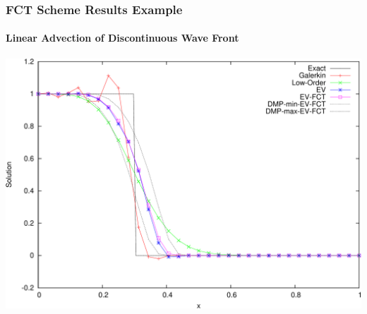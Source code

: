 \begin{frame}
\frametitle{FCT Scheme Results Example}
\framesubtitle{Linear Advection of Discontinuous Wave Front}

\includegraphics[width=\textwidth]{./figures/advection_FCT.pdf}

\end{frame}
